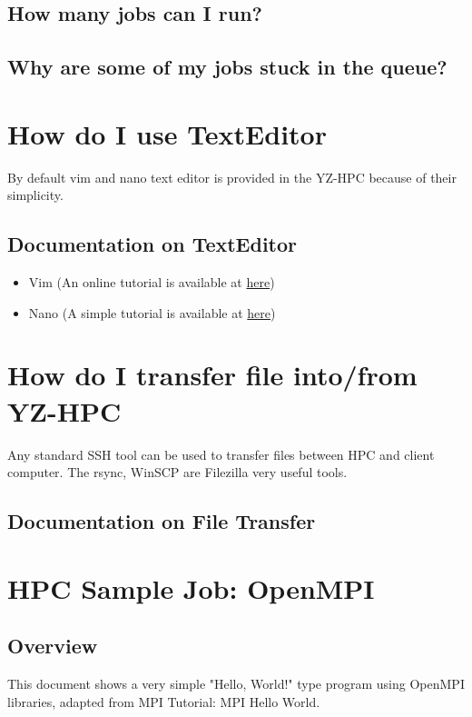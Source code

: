\documentclass[11pt]{article}
\numberwithin{figure}{section}
\begin{document}
\subsection{How many jobs can I run?}
\subsection{Why are some of my jobs stuck in the queue?}

\section{How do I use TextEditor}
By default vim and nano text editor is provided in the YZ-HPC because of their
simplicity.

\subsection{Documentation on TextEditor}
\begin{itemize}
    \item Vim (An online tutorial is available at \href{http://www.openvim.com}{here})
    \item Nano (A simple tutorial is available at \href{https://staffwww.fullcoll.edu/sedwards/Nano/IntroToNano.html}{here}) 
\end{itemize}

\section{How do I transfer file into/from YZ-HPC}
Any standard SSH tool can be used to transfer files between HPC and client
computer. The rsync, WinSCP are Filezilla very useful tools.

\subsection{Documentation on File Transfer}

\section{HPC Sample Job: OpenMPI}
\subsection{Overview}
This document shows a very simple "Hello, World!" type program using OpenMPI
libraries, adapted from MPI Tutorial: MPI Hello World.
\end{document}
